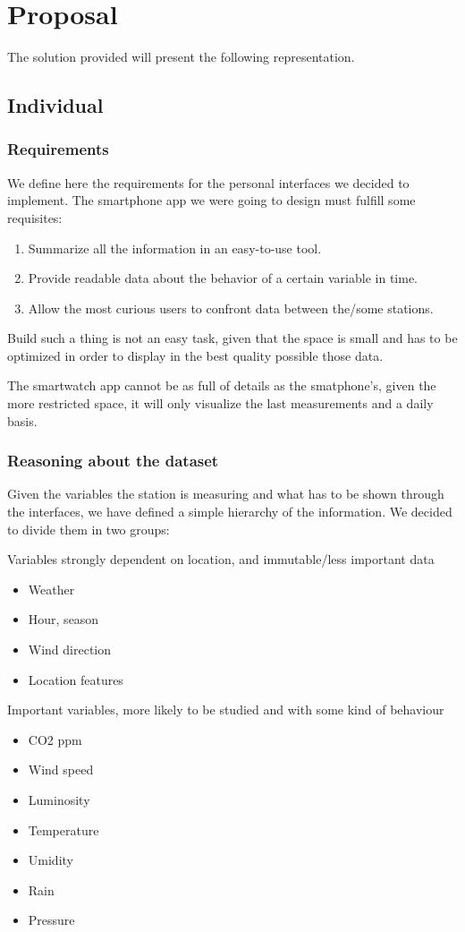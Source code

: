 \documentclass[12pt]{article} %
\begin{document}
\begin{itemize}
\end{itemize} 
\section{Proposal}
The solution provided will present the following representation. 
\subsection{Individual}
\subsubsection{Requirements}
We define here the requirements for the personal interfaces we decided to implement.
The smartphone app we were going to design must fulfill some requisites:
\begin{enumerate}
	\item Summarize all the information in an easy-to-use tool.
	\item Provide readable data about the behavior of a certain variable in time.
	\item Allow the most curious users to confront data between the/some stations.
\end{enumerate}
Build such a thing is not an easy task, given that the space is small and has to be optimized in order to display in the best quality possible those data.

The smartwatch app cannot be as full of details as the smatphone's, given the more restricted space, it will only visualize the last measurements and a daily basis.
\subsubsection{Reasoning about the dataset}
Given the variables the station is measuring and what has to be shown through the interfaces, we have defined a simple hierarchy of the information.
We decided to divide them in two groups:
\begin{description}
\item Variables strongly dependent on location, and immutable/less important data
	\begin{itemize}	
	\item Weather
	\item Hour, season
	\item Wind direction
	\item Location features
	\end{itemize}
	
\item Important variables, more likely to be studied and with some kind of behaviour
	\begin{itemize}
	\item CO2 ppm
	\item Wind speed
	\item Luminosity
	\item Temperature
	\item Umidity
	\item Rain
	\item Pressure
	\end{itemize}
\end{description}
\end{document}
